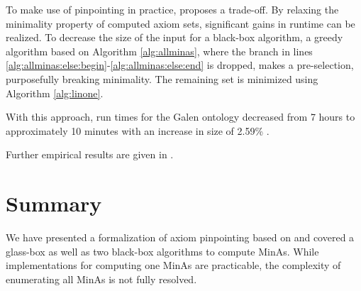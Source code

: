 \documentclass{llncs}
\begin{document}
To make use of pinpointing in practice, \cite[Sec.~5]{orig1,orig2} proposes a trade-off. By relaxing the minimality property of computed axiom sets, significant gains in runtime can be realized. To decrease the size of the input for a black-box algorithm, a greedy algorithm based on Algorithm \ref{alg:allminas}, where the branch in lines \ref{alg:allminas:else:begin}-\ref{alg:allminas:else:end} is dropped, makes a pre-selection, purposefully breaking minimality. The remaining set is minimized using Algorithm \ref{alg:linone}.

With this approach, run times for the Galen \cite{galen} ontology decreased from 7 hours to approximately 10 minutes with an increase in size of 2.59\% \cite[Sec.~5]{orig1,orig2}.

Further empirical results are given in \cite[Sec.~6.2.5, p.~127]{meng-phd}.

\section{Summary}
\label{sec:summary}

We have presented a formalization of axiom pinpointing based on \cite{orig1,orig2} and covered a glass-box as well as two black-box algorithms to compute MinAs. While implementations for computing one MinAs are practicable, the complexity of enumerating all MinAs is not fully resolved.


\end{document}
